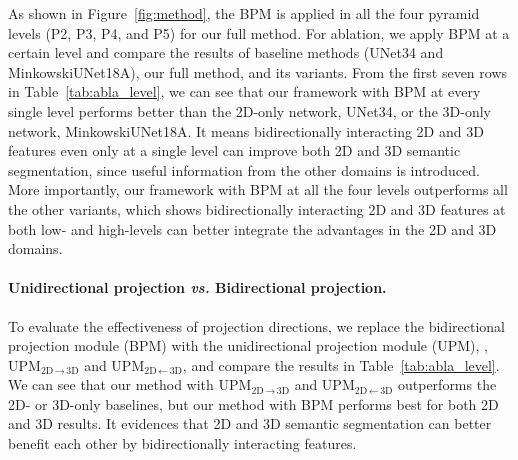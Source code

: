 \documentclass[final]{cvpr}
\begin{document}
As shown in Figure~\ref{fig:method}, the BPM is applied in all the four pyramid levels (P2, P3, P4, and P5) for our full method.
For ablation, we apply BPM at a certain level and compare the results of baseline methods (UNet34 and MinkowskiUNet18A), our full method, and its variants.
From the first seven rows in Table~\ref{tab:abla_level}, we can see that our framework with BPM at every single level performs better than the 2D-only network, UNet34, or the 3D-only network,  MinkowskiUNet18A.
It means bidirectionally interacting 2D and 3D features even only at a single level can improve both 2D and 3D semantic segmentation, since useful information from the other domains is introduced.
More importantly, our framework with BPM at all the four levels outperforms all the other variants, which shows bidirectionally interacting 2D and 3D features at both low- and high-levels can better integrate the advantages in the 2D and 3D domains.


\vspace{-4mm}
\paragraph{Unidirectional projection \textit{vs.} Bidirectional projection.}
To evaluate the effectiveness of projection directions, we replace the bidirectional projection module (BPM) with the unidirectional projection module (UPM), \ie, UPM$_{\text{2D}\,\rightarrow\,\text{3D}}$ and UPM$_{\text{2D}\,\leftarrow\,\text{3D}}$, and compare the results in Table~\ref{tab:abla_level}.
We can see that our method with UPM$_{\text{2D}\,\rightarrow\,\text{3D}}$ and UPM$_{\text{2D}\,\leftarrow\,\text{3D}}$ outperforms the 2D- or 3D-only baselines, but our method with BPM performs best for both 2D and 3D results. 
It evidences that 2D and 3D semantic segmentation can better benefit each other by bidirectionally interacting features.





\begin{table}[!t]
	\centering
	\renewcommand{\tabcolsep}{6.5pt}
		\vspace{0.5mm}
		\caption{
		2D and 3D semantic segmentation results of different view numbers on the validation set of ScanNetV2.
	}
	\label{tab:abla_view}
\end{table}
\end{document}

